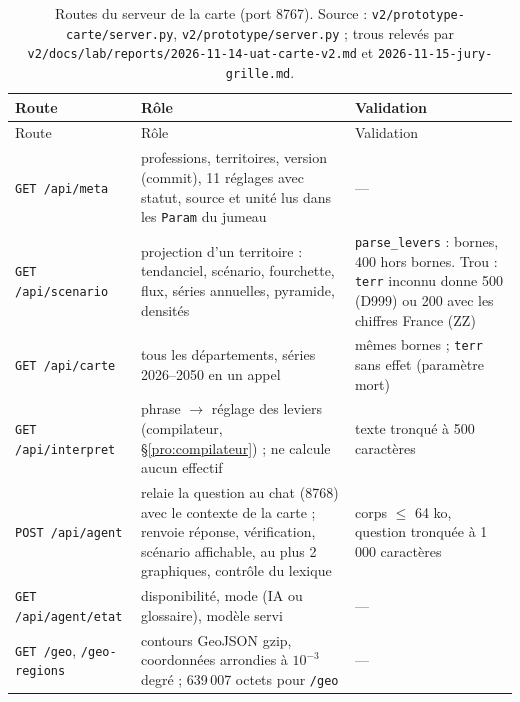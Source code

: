 \begin{small}
\begin{longtable}{@{}p{}p{}p{}@{}}
\caption{Routes du serveur de la carte (port 8767). Source : \texttt{v2/\allowbreak{}prototype-\allowbreak{}carte/\allowbreak{}server.py}, \texttt{v2/\allowbreak{}prototype/\allowbreak{}server.py} ; trous relevés par \texttt{v2/\allowbreak{}docs/\allowbreak{}lab/\allowbreak{}reports/\allowbreak{}2026-\allowbreak{}11-\allowbreak{}14-\allowbreak{}uat-\allowbreak{}carte-\allowbreak{}v2.md} et \texttt{2026-\allowbreak{}11-\allowbreak{}15-\allowbreak{}jury-\allowbreak{}grille.md}.}\label{pro:tab-routes}\\
\toprule Route & Rôle & Validation \\ \midrule\endfirsthead
\toprule Route & Rôle & Validation \\ \midrule\endhead
\bottomrule\endfoot
\texttt{GET /\allowbreak{}api/\allowbreak{}meta} & professions, territoires, version (commit), 11\mesure{} réglages avec statut, source et unité lus dans les \texttt{Param} du jumeau & --- \\
\texttt{GET /\allowbreak{}api/\allowbreak{}scenario} & projection d'un territoire : tendanciel, scénario, fourchette, flux, séries annuelles, pyramide, densités & \texttt{parse\_\allowbreak{}levers} : bornes, 400 hors bornes. Trou : \texttt{terr} inconnu donne 500 (D999) ou 200 avec les chiffres France (ZZ) \\
\texttt{GET /\allowbreak{}api/\allowbreak{}carte} & tous les départements, séries 2026--2050 en un appel & mêmes bornes ; \texttt{terr} sans effet (paramètre mort) \\
\texttt{GET /\allowbreak{}api/\allowbreak{}interpret} & phrase $\rightarrow$ réglage des leviers (compilateur, §\ref{pro:compilateur}) ; ne calcule aucun effectif & texte tronqué à 500\mesure{} caractères \\
\texttt{POST /\allowbreak{}api/\allowbreak{}agent} & relaie la question au chat (8768) avec le contexte de la carte ; renvoie réponse, vérification, scénario affichable, au plus 2\mesure{} graphiques, contrôle du lexique & corps $\leq$ 64\mesure{} ko, question tronquée à 1\,000\mesure{} caractères \\
\texttt{GET /\allowbreak{}api/\allowbreak{}agent/\allowbreak{}etat} & disponibilité, mode (IA ou glossaire), modèle servi & --- \\
\texttt{GET /\allowbreak{}geo}, \texttt{/\allowbreak{}geo-\allowbreak{}regions} & contours GeoJSON gzip, coordonnées arrondies à $10^{-3}$\mesure{} degré ; 639\,007\mesure{} octets pour \texttt{/\allowbreak{}geo} & --- \\
\end{longtable}
\end{small}

